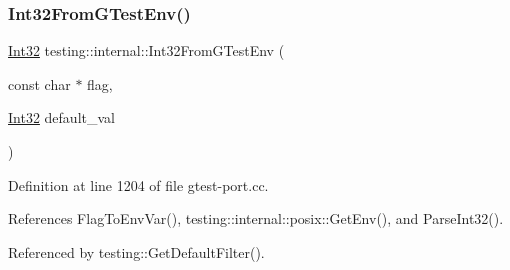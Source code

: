 \subsubsection{\texorpdfstring{Int32\+From\+G\+Test\+Env()}{Int32FromGTestEnv()}}
{\footnotesize\ttfamily \hyperlink{namespacetesting_1_1internal_a8ee38faaf875f133358abaf9bc056cec}{Int32} testing\+::internal\+::\+Int32\+From\+G\+Test\+Env (\begin{DoxyParamCaption}\item[{const char $\ast$}]{flag,  }\item[{\hyperlink{namespacetesting_1_1internal_a8ee38faaf875f133358abaf9bc056cec}{Int32}}]{default\+\_\+val }\end{DoxyParamCaption})}



Definition at line 1204 of file gtest-\/port.\+cc.



References Flag\+To\+Env\+Var(), testing\+::internal\+::posix\+::\+Get\+Env(), and Parse\+Int32().



Referenced by testing\+::\+Get\+Default\+Filter().


